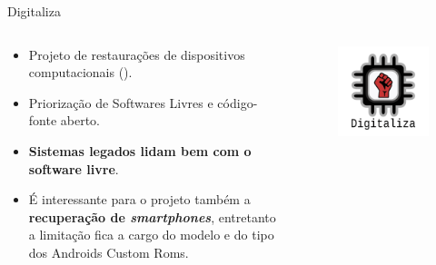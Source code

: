 \documentclass{beamer}
\begin{document}
\begin{frame}{Digitaliza}
    \begin{columns}
        \begin{column}{0.7\textwidth}
            \begin{itemize}
                \item Projeto de restaurações de dispositivos computacionais (\cite{VINIPAE}).
                \item Priorização de Softwares Livres e código-fonte aberto.
                \item \textbf{Sistemas legados lidam bem com o software livre}.
                \item É interessante para o projeto também a \textbf{recuperação de \textit{smartphones}}, entretanto a limitação fica a cargo do modelo e do tipo dos Androids Custom Roms.
            \end{itemize}
        \end{column}
        \begin{column}{0.3\textwidth}
            \begin{figure}
                \centering
                \includegraphics[width=1\linewidth]{img/digitaliza.png}
            \end{figure}
        \end{column}
    \end{columns}
\end{frame}
\end{document}
